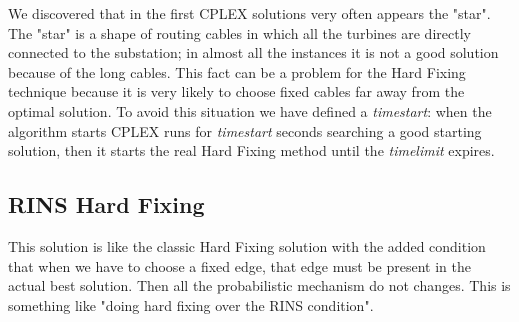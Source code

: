We discovered that in the first \textsc{CPLEX} solutions very often appears the "star". The "star" is a shape of routing cables in which all the turbines are directly connected to the substation; in almost all the instances it is not a good solution because of the long cables. This fact can be a problem for the Hard Fixing technique because it is very likely to choose fixed cables far away from the optimal solution. To avoid this situation we have defined a \textit{timestart}: when the algorithm starts \textsc{CPLEX} runs for \textit{timestart} seconds searching a good starting solution, then it starts the real Hard Fixing method until the \textit{timelimit} expires. 

\subsection{RINS Hard Fixing}
This solution is like the classic Hard Fixing solution with the added condition that when we have to choose a fixed edge, that edge must be present in the actual best solution. Then all the probabilistic mechanism do not changes. This is something like "doing hard fixing over the RINS condition". 


